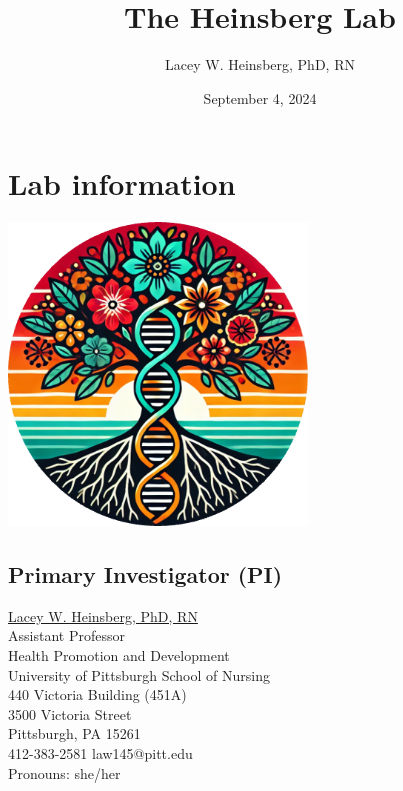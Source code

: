 \documentclass[
  letterpaper,
  DIV=11,
  numbers=noendperiod]{scrreprt}
\title{The Heinsberg Lab}
\author{Lacey W. Heinsberg, PhD, RN}
\date{September 4, 2024}
\renewcommand*\contentsname{Table of contents}
\newcommand\contentsname{Table of contents}
\begin{document}
\maketitle

\renewcommand*\contentsname{Table of contents}
{
\hypersetup{linkcolor=}
\setcounter{tocdepth}{2}
\tableofcontents
}

\chapter*{Lab information}\label{lab-information}


\begin{center}
\includegraphics[width=3.125in,height=\textheight]{HeinsbergLab.png}
\end{center}

\section*{Primary Investigator (PI)}\label{primary-investigator-pi}


\href{https://www.nursing.pitt.edu/person/lacey-w-heinsberg}{Lacey W.
Heinsberg, PhD, RN}\\
Assistant Professor\\
Health Promotion and Development\\
University of Pittsburgh School of Nursing\\
440 Victoria Building (451A)\\
3500 Victoria Street\\
Pittsburgh, PA 15261\\
412-383-2581 \textbar{} law145@pitt.edu\\
Pronouns: she/her
\end{document}
